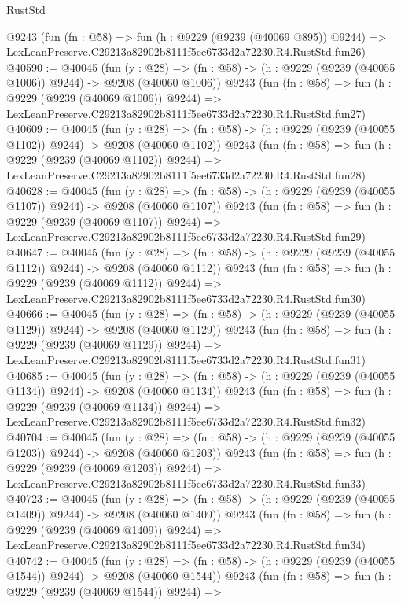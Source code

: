 \begin{lexlean}{RustStd}
\begin{coremodule}
    @9243
    (fun (fn : @58) =>
    fun (h : @9229 (@9239 (@40069 @895)) @9244) =>
    LexLeanPreserve.C29213a82902b8111f5ee6733d2a72230.R4.RustStd.fun26)
@40590 := @40045
    (fun (y : @28) =>
    (fn : @58) -> (h : @9229 (@9239 (@40055 @1006)) @9244) -> @9208 (@40060 @1006))
    @9243
    (fun (fn : @58) =>
    fun (h : @9229 (@9239 (@40069 @1006)) @9244) =>
    LexLeanPreserve.C29213a82902b8111f5ee6733d2a72230.R4.RustStd.fun27)
@40609 := @40045
    (fun (y : @28) =>
    (fn : @58) -> (h : @9229 (@9239 (@40055 @1102)) @9244) -> @9208 (@40060 @1102))
    @9243
    (fun (fn : @58) =>
    fun (h : @9229 (@9239 (@40069 @1102)) @9244) =>
    LexLeanPreserve.C29213a82902b8111f5ee6733d2a72230.R4.RustStd.fun28)
@40628 := @40045
    (fun (y : @28) =>
    (fn : @58) -> (h : @9229 (@9239 (@40055 @1107)) @9244) -> @9208 (@40060 @1107))
    @9243
    (fun (fn : @58) =>
    fun (h : @9229 (@9239 (@40069 @1107)) @9244) =>
    LexLeanPreserve.C29213a82902b8111f5ee6733d2a72230.R4.RustStd.fun29)
@40647 := @40045
    (fun (y : @28) =>
    (fn : @58) -> (h : @9229 (@9239 (@40055 @1112)) @9244) -> @9208 (@40060 @1112))
    @9243
    (fun (fn : @58) =>
    fun (h : @9229 (@9239 (@40069 @1112)) @9244) =>
    LexLeanPreserve.C29213a82902b8111f5ee6733d2a72230.R4.RustStd.fun30)
@40666 := @40045
    (fun (y : @28) =>
    (fn : @58) -> (h : @9229 (@9239 (@40055 @1129)) @9244) -> @9208 (@40060 @1129))
    @9243
    (fun (fn : @58) =>
    fun (h : @9229 (@9239 (@40069 @1129)) @9244) =>
    LexLeanPreserve.C29213a82902b8111f5ee6733d2a72230.R4.RustStd.fun31)
@40685 := @40045
    (fun (y : @28) =>
    (fn : @58) -> (h : @9229 (@9239 (@40055 @1134)) @9244) -> @9208 (@40060 @1134))
    @9243
    (fun (fn : @58) =>
    fun (h : @9229 (@9239 (@40069 @1134)) @9244) =>
    LexLeanPreserve.C29213a82902b8111f5ee6733d2a72230.R4.RustStd.fun32)
@40704 := @40045
    (fun (y : @28) =>
    (fn : @58) -> (h : @9229 (@9239 (@40055 @1203)) @9244) -> @9208 (@40060 @1203))
    @9243
    (fun (fn : @58) =>
    fun (h : @9229 (@9239 (@40069 @1203)) @9244) =>
    LexLeanPreserve.C29213a82902b8111f5ee6733d2a72230.R4.RustStd.fun33)
@40723 := @40045
    (fun (y : @28) =>
    (fn : @58) -> (h : @9229 (@9239 (@40055 @1409)) @9244) -> @9208 (@40060 @1409))
    @9243
    (fun (fn : @58) =>
    fun (h : @9229 (@9239 (@40069 @1409)) @9244) =>
    LexLeanPreserve.C29213a82902b8111f5ee6733d2a72230.R4.RustStd.fun34)
@40742 := @40045
    (fun (y : @28) =>
    (fn : @58) -> (h : @9229 (@9239 (@40055 @1544)) @9244) -> @9208 (@40060 @1544))
    @9243
    (fun (fn : @58) =>
    fun (h : @9229 (@9239 (@40069 @1544)) @9244) =>

\end{coremodule}
\end{lexlean}
